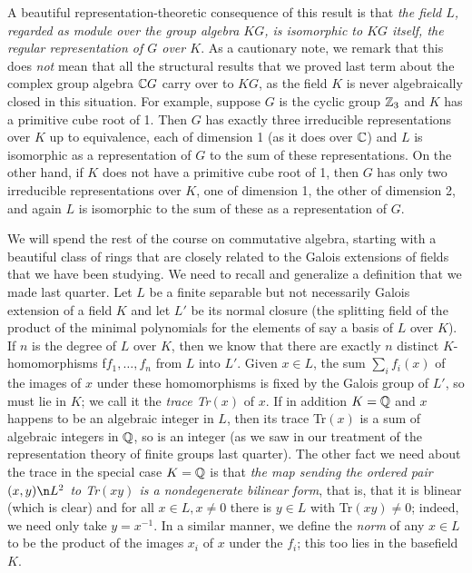 A beautiful representation-theoretic consequence of this result is that {\sl the field $L$, regarded as module over the group algebra $KG$, is isomorphic to $KG$ itself, the regular representation of $G$ over $K$}.  As a cautionary note, we remark that this does {\sl not} mean that all the structural results that we proved last term about the complex group algebra $\Bbb CG$ carry over to $KG$, as the field $K$ is never algebraically closed in this situation.  For example, suppose $G$ is the cyclic group
$\Bbb Z_3$ and $K$ has a primitive cube root of 1.  Then $G$ has exactly three irreducible representations over $K$ up to equivalence, each of dimension 1 (as it does over $\Bbb C$) and $L$ is isomorphic as a representation of $G$ to the sum of these representations.  On the other hand, if $K$ does not have a primitive cube root of 1, then $G$ has only two irreducible representations over $K$, one of dimension 1, the other of dimension 2, and again $L$ is isomorphic to the sum of these as a representation of $G$.  

We will spend the rest of the course on commutative algebra, starting with a beautiful class of rings that are closely related to the Galois extensions of fields that we have been studying.  We need to recall and generalize a definition that we made last quarter.  Let $L$ be a finite separable but not necessarily Galois extension of a field $K$ and let $L'$ be its normal closure (the splitting field of the product of the minimal polynomials for the elements of say a basis of $L$ over $K$).  If $n$ is the degree of $L$ over $K$, then we know that there are exactly $n$ distinct $K$-homomorphisms f$f_1,\ldots,f_n$ from $L$ into $L'$.  Given $x\in L$, the sum $\sum_i f_i(x)$ of the images of $x$ under these homomorphisms is fixed by the Galois group of $L'$, so must lie in $K$; we call it the {\sl trace Tr$(x)$} of $x$.   If in addition $K=\Bbb Q$ and $x$ happens to be an algebraic integer in $L$, then its trace Tr$(x)$ is a sum of algebraic integers in $\Bbb Q$, so is an integer (as we saw in our treatment of the representation theory of finite groups last quarter).  The other fact we need about the trace in the special case $K=\Bbb Q$ is that {\sl the map sending the ordered pair $(x,y)\n L^2$ to
Tr$(xy)$ is a nondegenerate bilinear form}, that is, that it is blinear (which is clear) and for all $x\in L,x\ne0$ there is $y\in L$ with Tr$(xy)\ne0$; indeed, we need only take $y = x^{-1}$.  In a similar manner, we define the {\sl norm} of any $x\in L$ to be the product of the images $x_i$ of $x$ under the $f_i$; this too lies in the basefield $K$.